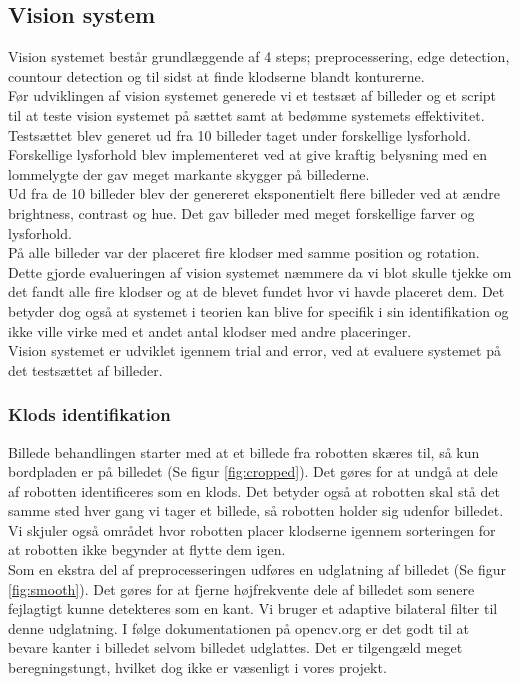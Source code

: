 \subsection{Vision system}
Vision systemet består grundlæggende af 4 steps; preprocessering, edge detection, countour detection og til sidst at finde klodserne blandt konturerne. \\

Før udviklingen af vision systemet generede vi et testsæt af billeder og et script til at teste vision systemet på sættet samt at bedømme systemets effektivitet.
Testsættet blev generet ud fra 10 billeder taget under forskellige lysforhold.
Forskellige lysforhold blev implementeret ved at give kraftig belysning med en lommelygte der gav meget markante skygger på billederne. \\
Ud fra de 10 billeder blev der genereret eksponentielt flere billeder ved at ændre brightness, contrast og hue.
Det gav billeder med meget forskellige farver og lysforhold. \\
På alle billeder var der placeret fire klodser med samme position og rotation.
Dette gjorde evalueringen af vision systemet næmmere da vi blot skulle tjekke om det fandt alle fire klodser og at de blevet fundet hvor vi havde placeret dem.
Det betyder dog også at systemet i teorien kan blive for specifik i sin identifikation og ikke ville virke med et andet antal klodser med andre placeringer. \\

Vision systemet er udviklet igennem trial and error, ved at evaluere systemet på det testsættet af billeder. \\

\subsubsection{Klods identifikation}

Billede behandlingen starter med at et billede fra robotten skæres til, så kun bordpladen er på billedet (Se figur \ref{fig:cropped}).
Det gøres for at undgå at dele af robotten identificeres som en klods.
Det betyder også at robotten skal stå det samme sted hver gang vi tager et billede, så robotten holder sig udenfor billedet.
Vi skjuler også området hvor robotten placer klodserne igennem sorteringen for at robotten ikke begynder at flytte dem igen. \\

Som en ekstra del af preprocesseringen udføres en udglatning af billedet (Se figur \ref{fig:smooth}).
Det gøres for at fjerne højfrekvente dele af billedet som senere fejlagtigt kunne detekteres som en kant.
Vi bruger et adaptive bilateral filter til denne udglatning.
I følge dokumentationen på opencv.org er det godt til at bevare kanter i billedet selvom billedet udglattes. Det er tilgengæld meget beregningstungt, hvilket dog ikke er væsenligt i vores projekt. \\

